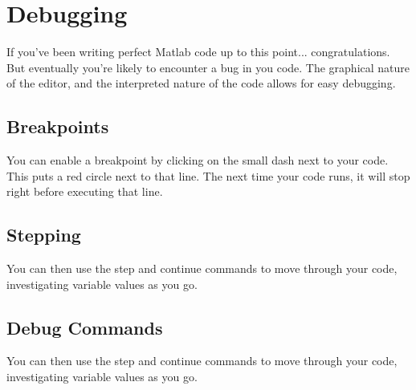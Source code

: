 
\pagebreak
\section{Debugging}
If you've been writing perfect Matlab code up to this point... congratulations.
 But eventually you're likely to encounter a bug in you code.
 The graphical nature of the editor, and the interpreted nature of the code allows for easy debugging.

\subsection{Breakpoints}
You can enable a breakpoint by clicking on the small dash next to your code.
 This puts a red circle next to that line.
 The next time your code runs, it will stop right before executing that line.

\begin{quote}

\end{quote}

\pagebreak
\subsection{Stepping}
You can then use the step and continue commands to move through your code, investigating variable values as you go.

\begin{quote}
 
\end{quote}

\pagebreak
\subsection{Debug Commands}
You can then use the step and continue commands to move through your code, investigating variable values as you go.

\begin{quote}
 
\end{quote}
